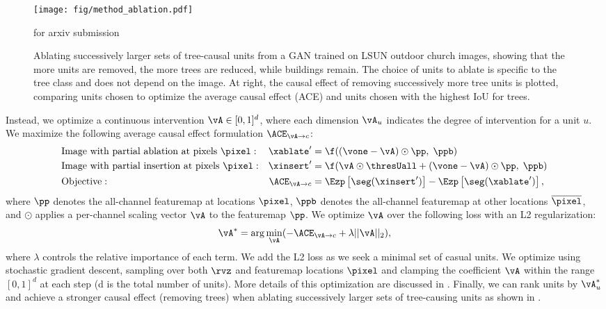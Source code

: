 \documentclass{article} %
\def\arxiv{for arxiv submission}
\begin{document}
\begin{figure}[t]
\centering
\texttt{[image: fig/method\_ablation.pdf]}
\vspace{-18pt}
\caption{
Ablating successively larger sets of tree-causal units from a GAN trained on LSUN outdoor church images, showing that the more units are removed, the more trees are reduced, while buildings remain. The choice of units to ablate is specific to the tree class and does not depend on the image.  At right, the causal effect of removing successively more tree units is plotted, comparing units chosen to optimize the average causal effect (ACE) and units chosen with the highest IoU for trees.}
\ifdefined\arxiv
\vspace{-10pt}
\else
\vspace{-7pt}
\fi
\end{figure}%
Instead, we optimize a continuous intervention  $\vA \in [0, 1]^{d}$, where each dimension $\vA_u$ indicates the degree of intervention for a unit $u$. We maximize the following average causal effect formulation $\ACE_{\vA\rightarrow c}$:
\begin{align}
\label{eq:aceopt}
&\text{Image with partial ablation at pixels $\pixel$}: &  \xablate' & = \f((\vone-\vA) \odot \pp, \; \ppb) \\ \nonumber
&\text{Image with partial insertion at pixels $\pixel$}: & \xinsert' & = \f(\vA \odot \thresUall + (\vone-\vA) \odot \pp, \; \ppb) \\ \nonumber
&\text{Objective}: & \ACE_{\vA\rightarrow c} & = \Ezp\left[ \seg(\xinsert')\right] - \Ezp\left[ \seg(\xablate')\right],
\end{align}
where $\pp$ denotes the all-channel featuremap at locations $\pixel$, $\ppb$ denotes the all-channel featuremap at other locations $\overline{\pixel}$, and $\odot$ applies a per-channel scaling vector $\vA$ to the featuremap $\pp$.
 We optimize $\vA$ over the following loss with an L2 regularization:
\begin{equation}
\vA^* = \arg \min_{\vA} (-\ACE_{\vA \rightarrow c} + \lambda ||\vA||_2),
\label{eq:acemax}
\end{equation}
where $\lambda$ controls the relative importance of each term. We add the L2 loss as we seek a minimal set of casual units. We optimize using stochastic gradient descent, sampling over both $\rvz$ and featuremap locations $\pixel$ and clamping the coefficient $\vA$ within the range $[0, 1]^d$ at each step (d is the total number of units).   More details of this optimization are discussed in .
Finally, we can rank units by $\vA_u^*$ and achieve a stronger causal effect (\ie removing trees) when ablating successively larger sets of tree-causing units as shown in .
\end{document}

